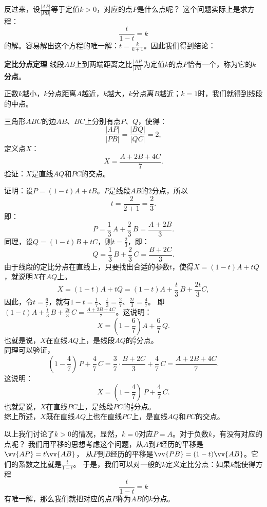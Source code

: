 \documentclass[12pt,UTF8,fontset=none]{ctexbook}
\begin{document}
反过来，设$ \frac{|AP|}{|PB|}$等于定值$k > 0$，对应的点$P$是什么点呢？
这个问题实际上是求方程：
$$ \frac{t}{1 - t} = k$$
的解。容易解出这个方程的唯一解：$t = \frac{k}{k+1}$。因此我们得到结论：
\begin{tm}{\textbf{定比分点定理} }\label{tm:0-0-10}
    线段$AB$上到两端距离之比$\frac{|AP|}{|PB|}$为定值$k$的点$P$恰有一个，称为它的$k$\textbf{分点}。
\end{tm}
正数$k$越小，$k$分点距离$A$越近，$k$越大，$k$分点离$B$越近；$k=1$时，我们就得到线段的中点。

\begin{et}\label{et:0-0-10}
    三角形$ABC$的边$AB$、$BC$上分别有点$P$、$Q$，使得：
    $$ \frac{|AP|}{|PB|} = \frac{|BQ|}{|QC|} = 2,$$
    定义点$X$：
    $$ X = \frac{A + 2B + 4C}{7}.$$
    验证：$X$是直线$AQ$和$PC$的交点。
\end{et}
\begin{so}
    证明：设$P = (1 - t)A + tB$。$P$是线段$AB$的$2$分点，所以
    $$ t = \frac{2}{2+1} = \frac23. $$
    即：
    $$ P = \frac13\, A + \frac23 \, B = \frac{A + 2B}{3}.$$
    同理，设$Q = (1 - t)B + tC$，则$t = \frac23$，即：
    $$ Q = \frac{1}{3} \, B + \frac{2}{3}\, C = \frac{B + 2C}{3}. $$
    由于线段的定比分点在直线上，只要找出合适的参数$t$，使得$X = (1 - t)A + tQ$，就说明$X$在$AQ$上。
    $$ X = (1 - t)A + tQ = (1 - t)A + \frac{t}{3}\,B + \frac{2t}{3}C,$$
    因此，令$t = \frac{6}{7}$，就有$1 - t = \frac{1}{7}$、$\frac{t}{3} = \frac27$、$\frac{2t}{3} = \frac{4}{7}$。
    即$(1 - t)A + \frac{t}{3} \, B + \frac{2t}{3} \, C = \frac{A + 2B + 4C}{7}$。这说明：
    $$ X = (1 - \frac{6}{7})A + \frac{6}{7} \, Q. $$
    也就是说，$X$在直线$AQ$上，是线段$AQ$的$\frac{6}{7}$分点。\\
    同理可以验证，
    $$ (1 - \frac{4}{7})\, P + \frac{4}{7}\, C = \frac{3}{7} \cdot \frac{B + 2C}{3} + \frac{4}{7} \, C = \frac{A + 2B + 4C}{7}. $$
    这说明：
    $$ X = (1 - \frac{4}{7}) \, P + \frac{4}{7} \, C. $$
    也就是说，$X$在直线$PC$上，是线段$PC$的$\frac{4}{7}$分点。\\
    综上所述，$X$既在直线$AQ$上也在直线$PC$上，是直线$AQ$和$PC$的交点。
\end{so}

以上我们讨论了$k>0$的情况，显然，$k=0$对应$P = A$。对于负数$k$，有没有对应的点呢？
我们用平移的思想考虑这个问题，从$A$到$P$经历的平移是$\vv{AP} = t\vv{AB}$，
从$P$到$B$经历的平移是$\vv{PB} = (1 - t)\vv{AB}$。它们的系数之比就是$ \frac{t}{1 - t}$。
于是，我们可以对一般的$k$定义定比分点：如果$k$能使得方程
$$ \frac{t}{1 - t} = k$$
有唯一解，那么我们就把对应的点$P$称为$AB$的$k$分点。
\end{document}
